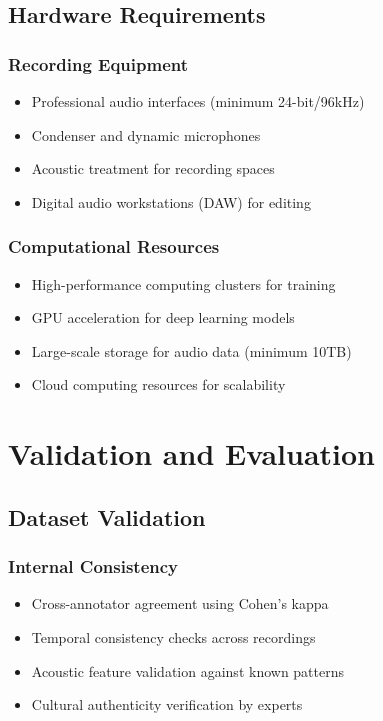 \documentclass[12pt]{article}
\begin{document}
\subsection{Hardware Requirements}

\subsubsection{Recording Equipment}
\begin{itemize}
    \item Professional audio interfaces (minimum 24-bit/96kHz)
    \item Condenser and dynamic microphones
    \item Acoustic treatment for recording spaces
    \item Digital audio workstations (DAW) for editing
\end{itemize}

\subsubsection{Computational Resources}
\begin{itemize}
    \item High-performance computing clusters for training
    \item GPU acceleration for deep learning models
    \item Large-scale storage for audio data (minimum 10TB)
    \item Cloud computing resources for scalability
\end{itemize}

\section{Validation and Evaluation}

\subsection{Dataset Validation}

\subsubsection{Internal Consistency}
\begin{itemize}
    \item Cross-annotator agreement using Cohen's kappa
    \item Temporal consistency checks across recordings
    \item Acoustic feature validation against known patterns
    \item Cultural authenticity verification by experts
\end{itemize}
\end{document}
